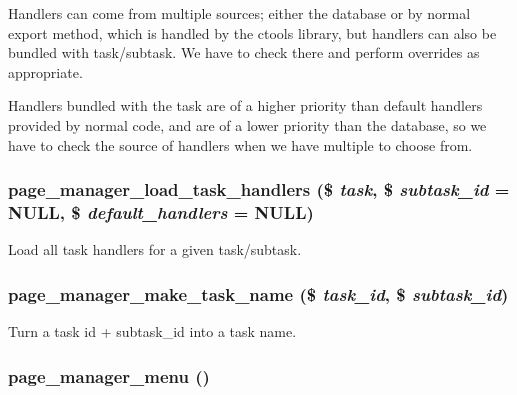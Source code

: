 Handlers can come from multiple sources; either the database or by normal export method, which is handled by the ctools library, but handlers can also be bundled with task/subtask. We have to check there and perform overrides as appropriate.

Handlers bundled with the task are of a higher priority than default handlers provided by normal code, and are of a lower priority than the database, so we have to check the source of handlers when we have multiple to choose from. \hypertarget{page__manager_8module_a3752551ca408f4c39310c0c1bf7ea787}{
\subsubsection[{page\_\-manager\_\-load\_\-task\_\-handlers}]{\setlength{\rightskip}{0pt plus 5cm}page\_\-manager\_\-load\_\-task\_\-handlers (\$ {\em task}, \/  \$ {\em subtask\_\-id} = {\ttfamily NULL}, \/  \$ {\em default\_\-handlers} = {\ttfamily NULL})}}
\label{page__manager_8module_a3752551ca408f4c39310c0c1bf7ea787}
Load all task handlers for a given task/subtask. \hypertarget{page__manager_8module_a77ee71b3f2d0a5c4228910dc8553efd1}{
\subsubsection[{page\_\-manager\_\-make\_\-task\_\-name}]{\setlength{\rightskip}{0pt plus 5cm}page\_\-manager\_\-make\_\-task\_\-name (\$ {\em task\_\-id}, \/  \$ {\em subtask\_\-id})}}
\label{page__manager_8module_a77ee71b3f2d0a5c4228910dc8553efd1}
Turn a task id + subtask\_\-id into a task name. \hypertarget{page__manager_8module_a64d2119bb7c032cf8d11b0431a7b4bc0}{
\subsubsection[{page\_\-manager\_\-menu}]{\setlength{\rightskip}{0pt plus 5cm}page\_\-manager\_\-menu ()}}
